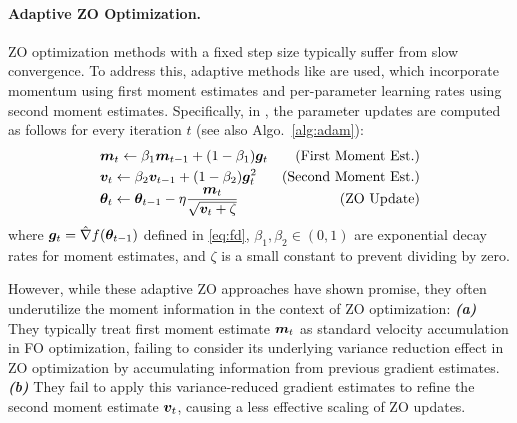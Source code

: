 \paragraph{Adaptive ZO Optimization.}

ZO optimization methods with a fixed step size typically suffer from slow convergence. To address this, adaptive methods like \base{} \citep{zo-adamm} are used, which incorporate momentum using first moment estimates and per-parameter learning rates using second moment estimates. Specifically, in \base{}, the parameter updates are computed as follows for every iteration $t$ (see also Algo.~\ref{alg:adam}):
\begin{equation}
\begin{aligned}
     &{\bm{m}}_t \gets \beta_1 {\bm{m}}_{t-1} + (1 - \beta_1) {\bm{g}}_t & \text{(First Moment Est.)} \\
    &{\bm{v}}_t \gets \beta_2 {\bm{v}}_{t-1} + (1- \beta_2) {\bm{g}}_t^{\smash{2}} & \text{(Second Moment Est.)}  \\[-3pt]
    &{\bm{\theta}}_t \gets {\bm{\theta}}_{t-1} - \eta\frac{{\bm{m}}_t}{\sqrt{{\bm{v}}_t + \zeta}} & \text{(ZO Update)}
\end{aligned}
\end{equation}
where ${\bm{g}}_t = \hat{\nabla} f({\bm{\theta}}_{t-1})$ defined in \eqref{eq:fd},  $\beta_1,\beta_2\in(0,1)$ are exponential decay rates for moment estimates, and $\zeta$ is a small constant to prevent dividing by zero.


However, while these adaptive ZO approaches have shown promise, they often underutilize the moment information in the context of ZO optimization: \textbf{\textit{(a)}} They typically treat first moment estimate ${\bm{m}}_t$ as standard velocity accumulation in FO optimization, failing to consider its underlying variance reduction effect in ZO optimization by accumulating information from previous gradient estimates. \textbf{\textit{(b)}} They fail to apply this variance-reduced gradient estimates to refine the second moment estimate ${\bm{v}}_t$, causing a less effective scaling of ZO updates.


